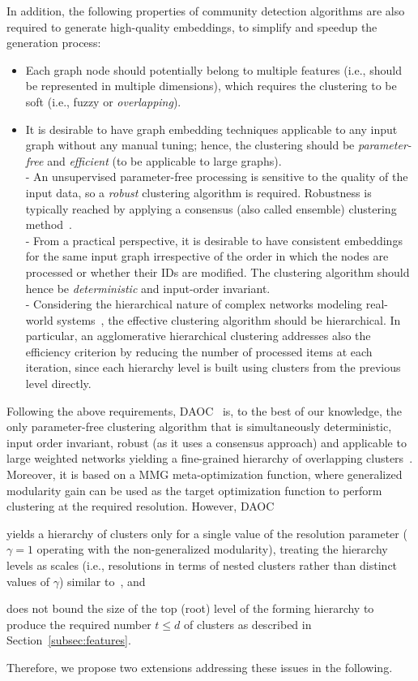 \documentclass[conference]{IEEEtran}
\begin{document}
In addition, the following properties of community detection algorithms are also required to generate high-quality embeddings, to simplify and speedup the generation process:
\begin{itemize}
\item Each graph node should potentially belong to multiple features (i.e., should be represented in multiple dimensions), which requires the clustering to be soft (i.e., fuzzy or \emph{overlapping}).  \item It is desirable to have graph embedding techniques applicable to any  input graph without any manual tuning; hence, the clustering should be \emph{parameter-free} and \emph{efficient} (to be applicable to large graphs).
\\- An unsupervised parameter-free processing is sensitive to the quality of the input data, so a \emph{robust} clustering algorithm is required. Robustness is typically reached by applying a consensus (also called ensemble) clustering method~\cite{Frd03,VgP11,Lnc12}.
\\- From a practical perspective, it is desirable to have consistent embeddings for the same input graph irrespective of the order in which the nodes are processed or whether their IDs are modified.
The clustering algorithm should hence be \emph{deterministic} and input-order invariant.
\\- Considering the hierarchical nature of complex networks modeling real-world systems~\cite{HSim62,Bara16}, the effective clustering algorithm should be hierarchical. In particular, an agglomerative hierarchical clustering addresses also the efficiency criterion by reducing the number of processed items at each iteration, since each hierarchy level is built using clusters from the previous level directly. 
\end{itemize}

Following the above requirements, DAOC~\cite{Daoc19} is, to the best of our knowledge, the only parameter-free clustering algorithm that is simultaneously deterministic, input order invariant, robust (as it uses a consensus approach) and applicable to large weighted networks yielding a fine-grained hierarchy of overlapping clusters~\cite{Clb18}. Moreover, it is based on a MMG meta-optimization function, where generalized modularity gain can be used as the target optimization function to perform clustering at the required resolution.
However, DAOC
\begin{inparaenum}
\item yields a hierarchy of clusters only for a single value of the resolution parameter ($\gamma = 1$ operating with the non-generalized modularity),
treating the hierarchy levels as scales (i.e., resolutions in terms of nested clusters rather than distinct values of $\gamma$) similar to~\cite{SalP07,Bld08}, and
\item does not bound the size of the top (root) level of the forming hierarchy to produce the required number $t \le d$ of clusters as described in Section~\ref{subsec:features}.
\end{inparaenum}
Therefore, we propose two extensions addressing these issues in the following.
\end{document}
